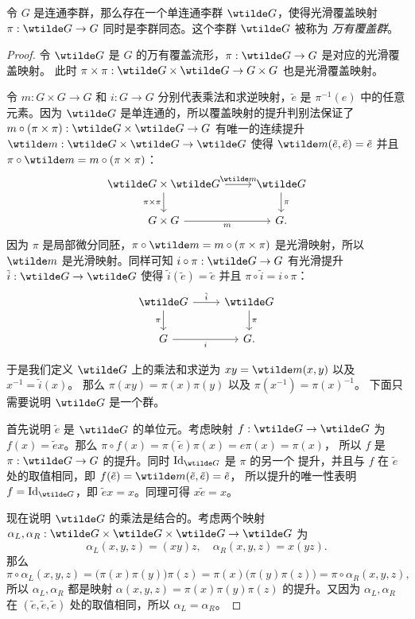 \begin{theorem}[万有覆盖群的存在性]
  令 $G$ 是连通李群，那么存在一个单连通李群 $\wtilde G$，使得光滑覆盖映射 $\pi:\wtilde G\to G$
  同时是李群同态。这个李群 $\wtilde G$ 被称为 \emph{万有覆盖群}。
\end{theorem}
\begin{proof}
  令 $\wtilde G$ 是 $G$ 的万有覆盖流形，$\pi:\wtilde G\to G$ 是对应的光滑覆盖映射。
  此时 $\pi\times\pi:\wtilde G\times\wtilde G\to G\times G$ 也是光滑覆盖映射。
  
  令 $m:G\times G\to G$ 和 $i:G\to G$ 分别代表乘法和求逆映射，$\tilde e$ 是 $\pi^{-1}(e)$
  中的任意元素。因为 $\wtilde G$ 是单连通的，所以覆盖映射的提升判别法保证了 
  $m\circ(\pi\times \pi):\wtilde G\times\wtilde G\to G$ 有唯一的连续提升 
  $\wtilde m:\wtilde G\times\wtilde G\to \wtilde G$ 使得 $\wtilde m(\tilde e,\tilde e)=\tilde e$
  并且 $\pi\circ\wtilde m=m\circ(\pi\times\pi)$：
  \[
    \begin{tikzcd}
      \wtilde G\times\wtilde G\arrow[r,"\wtilde m"]\arrow[d,"\pi\times\pi"']
       & \wtilde G\arrow[d,"\pi"] \\
      G\times G\arrow[r,"m"'] & G.
    \end{tikzcd}
  \]
  因为 $\pi$ 是局部微分同胚，$\pi\circ\wtilde m=m\circ(\pi\times\pi)$ 是光滑映射，所以
  $\wtilde m$ 是光滑映射。同样可知 $i\circ\pi:\wtilde G\to G$ 有光滑提升
  $\tilde i:\wtilde G\to\wtilde G$ 使得 $\tilde i(\tilde e)=\tilde e$ 并且 $\pi\circ\tilde i=i\circ\pi$：
  \[
    \begin{tikzcd}
      \wtilde G\arrow[r,"\tilde i"]\arrow[d,"\pi"'] 
      & \wtilde G\arrow[d,"\pi"] \\
      G\arrow[r,"i"'] & G.
    \end{tikzcd}
  \]

  于是我们定义 $\wtilde G$ 上的乘法和求逆为 $xy=\wtilde m(x,y)$ 以及 $x^{-1}=\tilde i(x)$。
  那么 $\pi(xy)=\pi(x)\pi(y)$ 以及 $\pi(x^{-1})=\pi(x)^{-1}$。
  下面只需要说明 $\wtilde G$ 是一个群。

  首先说明 $\tilde e$ 是 $\wtilde G$ 的单位元。考虑映射 $f:\wtilde G\to\wtilde G$
  为 $f(x)=\tilde ex$。那么 $\pi\circ f(x)=\pi(\tilde e)\pi(x)=e\pi(x)=\pi(x)$，
  所以 $f$ 是 $\pi:\wtilde G\to G$ 的提升。同时 $\Id_{\wtilde G}$ 是 $\pi$ 的另一个
  提升，并且与 $f$ 在 $\tilde e$ 处的取值相同，即 $f(\tilde e)=\wtilde m(\tilde e,\tilde e)=\tilde e$，
  所以提升的唯一性表明 $f=\Id_{\wtilde G}$，即 $\tilde ex=x$。同理可得
  $x\tilde e=x$。

  现在说明 $\wtilde G$ 的乘法是结合的。考虑两个映射 $\alpha_L,\alpha_R:\wtilde G\times \wtilde G\times \wtilde G\to\wtilde G$
  为
  \[
    \alpha_L(x,y,z)=(xy)z,\quad \alpha_R(x,y,z)=x(yz).
  \]
  那么 
  \[
    \pi\circ\alpha_L(x,y,z)=\bigl(\pi(x)\pi(y)\bigr)\pi(z)
    =\pi(x)\bigl(\pi(y)\pi(z)\bigr)=\pi\circ\alpha_R(x,y,z),
  \]
  所以 $\alpha_L,\alpha_R$ 都是映射 $\alpha(x,y,z)=\pi(x)\pi(y)\pi(z)$
  的提升。又因为 $\alpha_L,\alpha_R$ 在 $(\tilde e,\tilde e,\tilde e)$
  处的取值相同，所以 $\alpha_L=\alpha_R$。
  

\end{proof}
